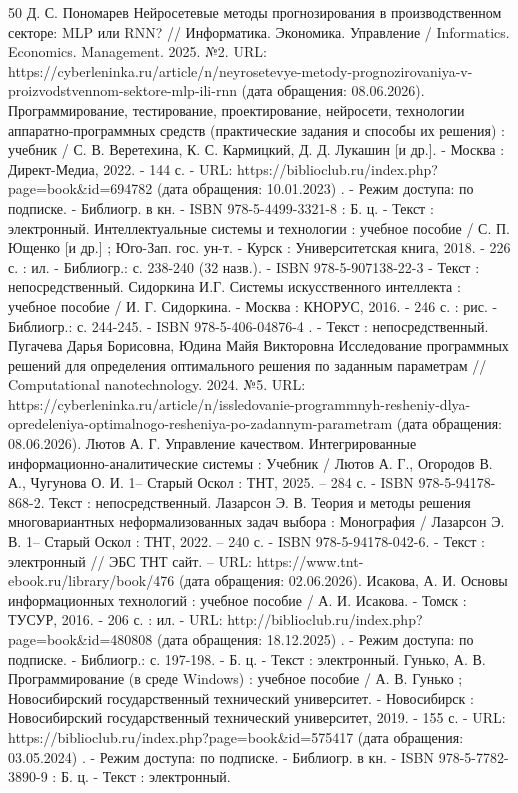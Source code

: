 \begin{thebibliography}{50}
 Д. С. Пономарев Нейросетевые методы прогнозирования в производственном секторе: MLP или RNN? // Информатика. Экономика. Управление / Informatics. Economics. Management. 2025. №2. URL: https://cyberleninka.ru/article/n/neyrosetevye-metody-prognozirovaniya-v-proizvodstvennom-sektore-mlp-ili-rnn (дата обращения: 08.06.2026).
 Программирование, тестирование, проектирование, нейросети, технологии аппаратно‐программных средств (практические задания и способы их решения) : учебник / С. В. Веретехина, К. С. Кармицкий, Д. Д. Лукашин [и др.]. - Москва : Директ-Медиа, 2022. - 144 с. - URL: https://biblioclub.ru/index.php?page=book\&id=694782 (дата обращения: 10.01.2023) . - Режим доступа: по подписке. - Библиогр. в кн. - ISBN 978-5-4499-3321-8 : Б. ц. - Текст : электронный.
 Интеллектуальные системы и технологии : учебное пособие / С. П. Ющенко [и др.] ; Юго-Зап. гос. ун-т. - Курск : Университетская книга, 2018. - 226 с. : ил. - Библиогр.: с. 238-240 (32 назв.). - ISBN 978-5-907138-22-3 - Текст : непосредственный.
 Сидоркина И.Г.  Системы искусственного интеллекта : учебное пособие / И. Г. Сидоркина. - Москва : КНОРУС, 2016. - 246 с. : рис. - Библиогр.: с. 244-245. - ISBN 978-5-406-04876-4 . - Текст : непосредственный.
 Пугачева Дарья Борисовна, Юдина Майя Викторовна Исследование программных решений для определения оптимального решения по заданным параметрам // Computational nanotechnology. 2024. №5. URL: https://cyberleninka.ru/article/n/issledovanie-programmnyh-resheniy-dlya-opredeleniya-optimalnogo-resheniya-po-zadannym-parametram (дата обращения: 08.06.2026).
 Лютов А. Г. Управление качеством. Интегрированные информационно-аналитические системы : Учебник / Лютов А. Г., Огородов В. А., Чугунова О. И. 1– Старый Оскол : ТНТ, 2025. – 284 с. - ISBN 978-5-94178-868-2. Текст : непосредственный.
Лазарсон Э. В. Теория и методы решения многовариантных неформализованных задач выбора : Монография / Лазарсон Э. В. 1– Старый Оскол : ТНТ, 2022. – 240 с. - ISBN 978-5-94178-042-6. -  Текст : электронный // ЭБС ТНТ сайт. – URL: https://www.tnt-ebook.ru/library/book/476 (дата обращения: 02.06.2026).
 Исакова, А. И.    Основы информационных технологий : учебное пособие / А. И. Исакова. - Томск : ТУСУР, 2016. - 206 с. : ил. - URL: http://biblioclub.ru/index.php?page=book\&id=480808 (дата обращения: 18.12.2025) . - Режим доступа: по подписке. - Библиогр.: с. 197-198. - Б. ц. - Текст : электронный.
 Гунько, А. В.    Программирование (в среде Windows) : учебное пособие / А. В. Гунько ; Новосибирский государственный технический университет. - Новосибирск : Новосибирский государственный технический университет, 2019. - 155 с. - URL: https://biblioclub.ru/index.php?page=book\&id=575417 (дата обращения: 03.05.2024) . - Режим доступа: по подписке. - Библиогр. в кн. - ISBN 978-5-7782-3890-9 : Б. ц. - Текст : электронный.

\end{thebibliography}
